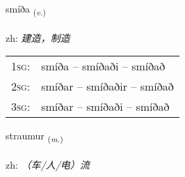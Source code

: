 \documentclass[frontgrid, backgrid]{flacards}\usepackage[]{graphicx}\usepackage[]{color}
\begin{document}
\renewcommand{\flhead}{\vskip5pt \fboxsep=0pt {\small\bfseries\footnotesize Sagnorð | 动词}}
\renewcommand{\fcfoot}{\vskip5pt \fboxsep=0pt \hspace{2pt}{\small\bfseries\footnotesize 2K}}

\renewcommand{\blhead}{\vskip5pt {\small\bfseries\footnotesize Sagnorð | 动词 }}
\renewcommand{\bcfoot}{\vskip5pt \hspace{2pt}{\small\bfseries\footnotesize 2K}}


{smíða \small{\textsubscript{(\textit{v.})}} \\[1ex] %
\textphonetic{[smiːða]} \\
zh: \emph{建造，制造} \\  [2ex]
\renewcommand*{\arraystretch}{0.8}
\begin{tabular}{p{1cm}l}
\textsc{1sg}: & smíða -- smíðaði -- smíðað \\ 
\textsc{2sg}: & smíðar -- smíðaðir -- smíðað \\ 
\textsc{3sg}: & smíðar -- smíðaði -- smíðað \\ 
\end{tabular}
}

\renewcommand{\flhead}{\vskip5pt \fboxsep=0pt {\small\bfseries\footnotesize Nafnorð | 名词}}
\renewcommand{\fcfoot}{\vskip5pt \fboxsep=0pt \hspace{2pt}{\small\bfseries\footnotesize 2K}}

\renewcommand{\blhead}{\vskip5pt {\small\bfseries\footnotesize Nafnorð | 名词 }}
\renewcommand{\bcfoot}{\vskip5pt \hspace{2pt}{\small\bfseries\footnotesize 2K}}


{straumur \small{\textsubscript{(\textit{m.})}} \\[1ex] %
\textphonetic{[strœiːmʏr]} \\
zh: \emph{（车/人/电）流} \\  [2ex]
\renewcommand*{\arraystretch}{0.8}
}
\end{document}
